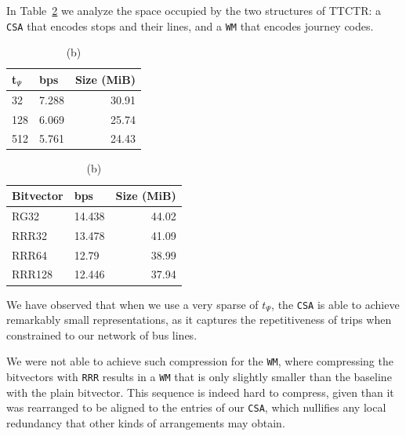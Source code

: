 \documentclass[runningheads]{llncs}
\newcommand{\ttctr}{TTCTR}
\begin{document}
In Table~\ref{tab:ttctr} we analyze the space occupied by the two structures of \ttctr: a \texttt{CSA} that encodes stops and their lines, and a \texttt{WM} that encodes journey codes.

\begin{table}
    \caption{Space requirements for the \texttt{CSA} (a) and the \texttt{WM} (b) from \ttctr}
    \label{tab:ttctr}
    \begin{subtable}[t]{.30\linewidth}
    \vspace{-12pt}
    \caption{\footnotesize (a)}
    \vspace{-12pt}
    \begin{tabular}[t]{|l|l|r|}
        \hline
        t$_\Psi$ & bps & Size (MiB) \\
         \hline
        32 & 7.288 & 30.91 \\
        128 & 6.069 & 25.74 \\
        512 & 5.761 & 24.43 \\
        \hline
    \end{tabular}
    \end{subtable}%
    \begin{subtable}[t]{.40\linewidth}
    \vspace{-12pt}
    \caption{\footnotesize (b)}
    \vspace{-12pt}
    \begin{tabular}[t]{|l|l|r|}
        \hline
        Bitvector & bps & Size (MiB) \\
         \hline
        RG32 & 14.438 & 44.02 \\
        RRR32 & 13.478 & 41.09 \\
        RRR64 & 12.79 & 38.99 \\
        RRR128 & 12.446 & 37.94 \\
        \hline
    \end{tabular}
    \end{subtable}
\end{table}

We have observed that when we use a very sparse of $t_\Psi$, the \texttt{CSA} is able to achieve remarkably small representations, as it captures the repetitiveness of trips when constrained to our network of bus lines.

We were not able to achieve such compression for the \texttt{WM}, where compressing the bitvectors with \texttt{RRR} results in a \texttt{WM} that is only slightly smaller than the baseline with the plain bitvector. This sequence is indeed hard to compress, given than it was rearranged to be aligned to the entries of our \texttt{CSA}, which nullifies any local redundancy that other kinds of arrangements may obtain.
\end{document}
